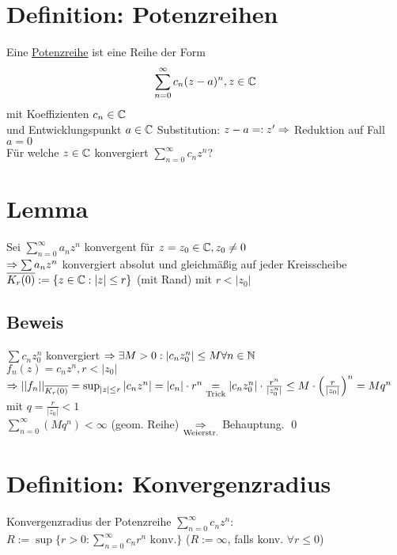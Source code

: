 \section{Definition: Potenzreihen}\label{13.8}
Eine \underline{Potenzreihe} ist eine Reihe der Form
$$\sum_{n=0}^\infty c_n(z-a)^n, z \in \mathbb{C}$$
mit Koeffizienten $c_n \in \mathbb{C}$\\
und Entwicklungspunkt $a \in \mathbb{C}$\nl
Substitution: $z-a =: z' \Rightarrow$ Reduktion auf Fall $a=0$\\
Für welche $z \in \mathbb{C}$ konvergiert $\sum_{n=0}^\infty c_n z^n$?


\section{Lemma}\label{13.9}
Sei $\sum_{n=0}^\infty a_n z^n$ konvergent für $z=z_0 \in \mathbb{C}, z_0 \neq 0$\\
$\Rightarrow \sum a_n z^n$ konvergiert absolut und gleichmäßig auf jeder Kreisscheibe $\overline{K_r(0)} := \{z \in \mathbb{C} : |z| \le r\}$ (mit Rand) mit $r < |z_0|$\nl
{}

\subsection*{Beweis}
$\sum c_n z_0^n$ konvergiert $\Rightarrow \exists M > 0: |c_n z_0^n| \le M \forall n \in \mathbb{N}$\\
$f_n(z) = c_n z^n, r < |z_0|$\\
$\Rightarrow ||f_n||_{\overline{K_r(0)}} = \sup_{|z| \le r} |c_n z^n| = |c_n| \cdot r^n \underset{\text{Trick}}{=} |c_n z_0^n| \cdot \frac{r^n}{|z_0^n|} \le M \cdot \left(\frac{r}{|z_0|}\right)^n = M q^n$ mit $q=\frac{r}{|z_0|} < 1$\\
$\sum_{n=0}^\infty (M q^n) < \infty$ (geom. Reihe) $\underset{\text{Weierstr.}}{\Rightarrow}$ Behauptung. \qed

\section{Definition: Konvergenzradius}\label{13.10}
Konvergenzradius der Potenzreihe $\sum_{n=0}^\infty c_n z^n$:\\
$R := \sup \{r>0: \sum_{n=0}^\infty c_n r^n \text{ konv.}\}$ ($R := \infty$, falls konv. $\forall r \le 0$)

